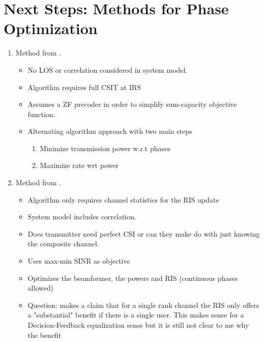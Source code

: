 \documentclass[12pt,a4paper]{report}
\begin{document}
\section{Next Steps: Methods for Phase Optimization}
\begin{enumerate}
\item
	Method from \cite{huang2018achievable}.
\begin{itemize}
\item
	No LOS or correlation considered in system model.
\item
	Algorithm requires full CSIT at IRS
\item 
	Assumes a ZF precoder in order to simplify sum-capacity objective function.
\item
	Alternating algorithm approach with two main steps
	\begin{enumerate}
	\item 
		Minimize transmission power w.r.t phases
	\item
		Maximize rate wrt power
	\end{enumerate}
\end{itemize}

\item 
	Method from \cite{kammoun2020asymptotic}.
	\begin{itemize}
		\item 
			Algorithm only requires channel statistics for the RIS update
		\item
			System model includes correlation.
		\item
			Does transmitter need perfect CSI or can they make do with just knowing the composite channel.
		\item
			Uses max-min SINR as objective
		\item
			Optimizes the beamformer, the powers and RIS (continuous phases allowed)
		\item
			Question: \cite[Section III ]{kammoun2020asymptotic} makes a claim that for a single rank channel the RIS only offers a "substantial" benefit if there
			is a single user.  This makes sense for a Decision-Feedback equalization sense but it is still not clear to me why the benefit
	\end{itemize}

\end{enumerate}

\end{document}
